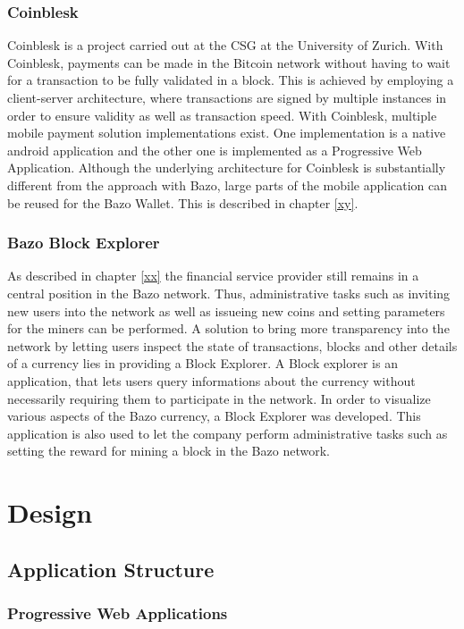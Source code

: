 \documentclass[a4paper]{article}
\begin{document}
\subsubsection{Coinblesk}
Coinblesk is a project carried out at the CSG at the University of Zurich. With Coinblesk, payments can be made in the Bitcoin network without having to wait for a transaction to be fully validated in a block. This is achieved by employing a client-server architecture, where transactions are signed by multiple instances in order to ensure validity as well as transaction speed.
With Coinblesk, multiple mobile payment solution implementations exist. One implementation is a native android application and the other one is implemented as a Progressive Web Application. Although the underlying architecture for Coinblesk is substantially different from the approach with Bazo, large parts of the mobile application can be reused for the Bazo Wallet. This is described in chapter \ref{xy}.
\subsubsection{Bazo Block Explorer}
As described in chapter \ref{xx} the financial service provider still remains in a central position in the Bazo network. Thus, administrative tasks such as inviting new users into the network as well as issueing new coins and setting 
parameters for the miners can be performed.
A solution to bring more transparency into the network by letting users inspect the state of transactions, blocks and other details of a currency lies in providing a Block Explorer. A Block explorer is an application, that lets users query informations about the currency without necessarily requiring them to participate in the network.
In order to visualize various aspects of the Bazo currency, a Block Explorer was developed. This application is also used to let the company perform administrative tasks such as setting the reward for mining a block in the Bazo network.
\newpage


\section{Design}

\subsection{Application Structure}

\subsubsection{Progressive Web Applications}
\end{document}
